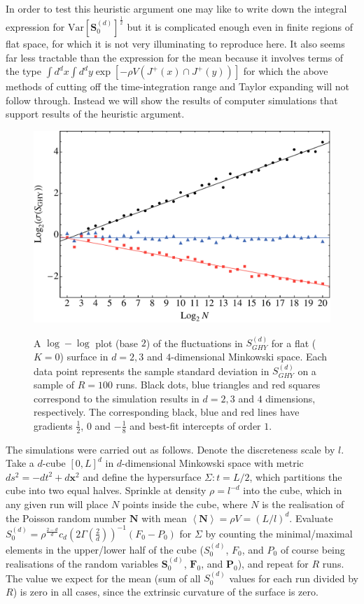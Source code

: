 \documentclass[12pt]{article}
\newcommand{\F}[1]{F_{#1}}
\renewcommand{\P}[1]{P_{#1}}
\newcommand{\BF}[1]{\mathbf{F}_{#1}}
\newcommand{\BP}[1]{\mathbf{P}_{#1}}
\begin{document}
In order to test this heuristic argument one may like to write down the integral expression for $\text{Var}[\textbf{S}^{ (d)}_0]^\frac12$ but it is complicated enough even in finite regions of flat space, for which it is not very illuminating to reproduce here. It also seems far less tractable than the expression for the mean because it involves terms of the type $\int d^dx\int d^dy \exp\left[-\rho V (J^+ (x)\cap J^+ (y))\right]$ for which the above methods of cutting off the time-integration range and Taylor expanding will not follow through. Instead we will show the results of computer simulations that support results of the heuristic argument. 

\begin{figure}[t!]
  \centering
    {\includegraphics[scale=0.6]{GHY-fluctuation_plots}}
     \caption{A $\log-\log$ plot (base $2$) of the fluctuations in $S^{ (d)}_{GHY}$ for a flat ($K=0$) surface in $d=2,3$ and $4$-dimensional Minkowski space. Each data point represents the sample standard deviation in $S^{ (d)}_{GHY}$ on a sample of $R=100$ runs. Black dots, blue triangles and red squares correspond to the simulation results in $d=2,3$ and $4$ dimensions, respectively. The corresponding black, blue and red lines have gradients $\frac12$, $0$ and $-\frac18$ and best-fit intercepts of order $1$.}
     \label{fig:fluctuations}
\end{figure}

 
The simulations were carried out as follows. Denote the discreteness scale by $l$. Take a $d$-cube $[0,L]^d$ in $d$-dimensional Minkowski space with metric $ds^2=-dt^2+d{\mathbf x}^2$ and define the hypersurface $\Sigma: t=L/2$, which partitions the cube into two equal halves. Sprinkle at density $\rho=l^{-d}$ into the cube, which in any given run will place $N$ points inside the cube, where $N$ is the realisation of the Poisson random number $\textbf{N}$ with mean $\left\langle \textbf{N}\right\rangle = \rho V=  (L/l)^d$. Evaluate $S^{ (d)}_0=\rho^\frac{2-d}{d}c_d\left (2\Gamma\left (\frac{2}{d}\right)\right)^{-1} (\F{0} - \P{0})$ for $\Sigma$ by counting the minimal/maximal elements in the upper/lower half of the cube ($S^{ (d)}_0$, $\F{0}$, and $\P{0}$ of course being realisations of the random variables $\textbf{S}^{ (d)}_0$, $\BF{0}$, and $\BP{0}$), and repeat for $R$ runs. The value we expect for the mean (sum of all $S^{ (d)}_0$ values for each run divided by $R$) is zero in all cases, since the extrinsic curvature of the surface is zero.
\end{document}
